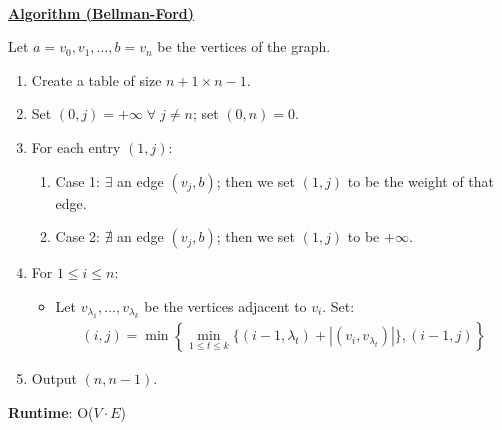 \documentclass[12pt]{extarticle}
\theoremstyle{definition}
\theoremstyle{remark}
\newcommand{\probtitle}[1]{\noindent \textbf{\ul{#1}}}
\begin{document}
~\\
\begin{tcolorbox}[colback=blue!80!red!10!white]
    \noindent\probtitle{Algorithm (Bellman-Ford)}

    \vspace{8pt}
    \noindent Let $a=v_0,v_1,\hdots,b=v_n$ be the vertices of the graph.
    \begin{enumerate}
        \item Create a table of size $n+1\times n-1$.
        \item Set $(0,j)=+\infty\;\forall\;j\neq n$; set $(0,n)=0$.
        \item For each entry $(1, j)$: \begin{enumerate}
            \item Case 1: $\exists$ an edge $(v_j,b)$; then we set $(1,j)$ to be the weight of that edge.
            \item Case 2: $\nexists$ an edge $(v_j,b)$; then we set $(1,j)$ to be $+\infty$.
        \end{enumerate}
        \item For $1\leq i\leq n$: \begin{itemize}
            \item Let $v_{\lambda_1},\hdots,v_{\lambda_k}$ be the vertices adjacent to $v_i$. Set:
            \begin{gather*}
                (i,j)=\min\left\{\min_{1\leq t\leq k}\{(i-1,\lambda_t)+|(v_i,v_{\lambda_t})|\},(i-1,j)\right\}
            \end{gather*}
        \end{itemize}
        \item Output $(n,n-1)$.
    \end{enumerate}
    \vspace{5pt}
    \textbf{Runtime}: O($V\cdot E$)
\end{tcolorbox}
\end{document}
